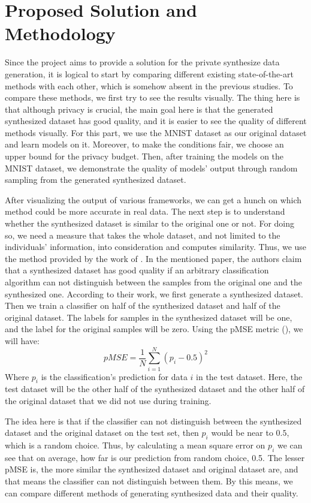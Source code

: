 \documentclass{article}
\begin{document}
\section{Proposed Solution and Methodology}

Since the project aims to provide a solution for the private synthesize data generation, it is logical to start by comparing different existing state-of-the-art methods with each other, which is somehow absent in the previous studies. To compare these methods, we first try to see the results visually. The thing here is that although privacy is crucial, the main goal here is that the generated synthesized dataset has good quality, and it is easier to see the quality of different methods visually. For this part, we use the MNIST dataset as our original dataset and learn models on it. Moreover, to make the conditions fair, we choose an upper bound for the privacy budget. Then, after training the models on the MNIST dataset, we demonstrate the quality of models' output through random sampling from the generated synthesized dataset.

After visualizing the output of various frameworks, we can get a hunch on which method could be more accurate in real data. The next step is to understand whether the synthesized dataset is similar to the original one or not. For doing so, we need a measure that takes the whole dataset, and not limited to the individuals' information, into consideration and computes similarity. Thus, we use the method provided by the work of \cite{snoke2018pmse}. In the mentioned paper, the authors claim that a synthesized dataset has good quality if an arbitrary classification algorithm can not distinguish between the samples from the original one and the synthesized one. According to their work, we first generate a synthesized dataset. Then we train a classifier on half of the synthesized dataset and half of the original dataset. The labels for samples in the synthesized dataset will be one, and the label for the original samples will be zero. Using the pMSE metric (\cite{snoke2018pmse}), we will have:
\[
pMSE = \frac{1}{N} \sum_{i=1}^{N}(p_i - 0.5)^2
\]
Where $p_i$ is the classification's prediction for data $i$ in the test dataset. Here, the test dataset will be the other half of the synthesized dataset and the other half of the original dataset that we did not use during training.

The idea here is that if the classifier can not distinguish between the synthesized dataset and the original dataset on the test set, then $p_i$ would be near to $0.5$, which is a random choice. Thus, by calculating a mean square error on $p_i$ we can see that on average, how far is our prediction from random choice, 0.5. The lesser pMSE is, the more similar the synthesized dataset and original dataset are, and that means the classifier can not distinguish between them. By this means, we can compare different methods of generating synthesized data and their quality.
\end{document}

